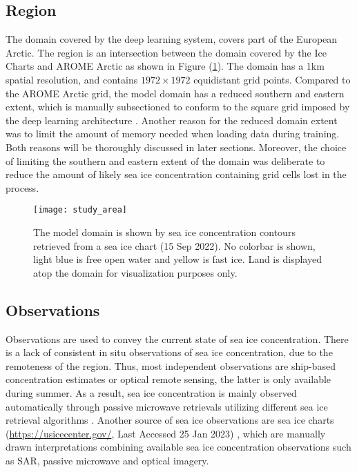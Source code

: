 \documentclass[../main/thesis.tex]{subfiles}
\begin{document}
\subsection{Region}
The domain covered by the deep learning system, covers part of the European Arctic. The region is an intersection between the domain covered by the Ice Charts \citep{Dinessen2020} and AROME Arctic \citep{Mueller2017} as shown in Figure (\ref{fig:studyarea}). The domain has a 1km spatial resolution, and contains $1972 \times 1972$ equidistant grid points. Compared to the AROME Arctic grid, the model domain has a reduced southern and eastern extent, which is manually subsectioned to conform to the square grid imposed by the deep learning architecture \citep{Ronneberger2015}. Another reason for the reduced domain extent was to limit the amount of memory needed when loading data during training. Both reasons will be thoroughly discussed in later sections. Moreover, the choice of limiting the southern and eastern extent of the domain was deliberate to reduce the amount of likely sea ice concentration containing grid cells lost in the process.

\begin{figure}
    \centering
    \texttt{[image: study\_area]}
    \caption{\label{fig:studyarea}The model domain is shown by sea ice concentration contours retrieved from a sea ice chart (15 Sep 2022). No colorbar is shown, light blue is free open water and yellow is fast ice. Land is displayed atop the domain for visualization purposes only.}
\end{figure}

\subsection{Observations}
Observations are used to convey the current state of sea ice concentration. There is a lack of consistent in situ observations of sea ice concentration, due to the remoteness of the region. Thus, most independent observations are ship-based concentration estimates \citep{Kern2019} or optical remote sensing, the latter is only available during summer. As a result, sea ice concentration is mainly observed automatically through passive microwave retrievals utilizing different sea ice retrieval algorithms \citep{Lavergne2019a, Comiso1997,Spreen2008}. Another source of sea ice observations are sea ice charts (\url{https://usicecenter.gov/}, Last Accessed 25 Jan 2023) \citep{Dinessen2020}, which are manually drawn interpretations combining available sea ice concentration observations such as SAR, passive microwave and optical imagery. 
\end{document}
